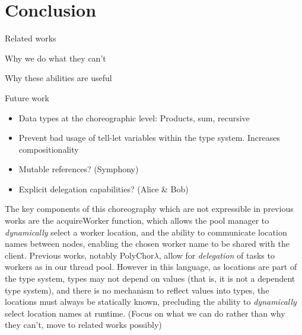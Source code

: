 \section{Conclusion}
\label{sec:conclusion}


\todo Related works

\todo Why we do what they can't

\todo Why these abilities are useful

\todo Future work
\begin{itemize}
	\item Data types at the choreographic level: Products, sum, recursive
	\item Prevent bad usage of tell-let variables within the type system. Increases compositionality
	\item Mutable references? (Symphony)
	\item Explicit delegation capabilities? (Alice \& Bob)
\end{itemize}

The key components of this choreography which are not expressible in previous works are the \textsf{acquireWorker} function, which allows the pool manager to \emph{dynamically} select a worker location, and the ability to communicate location names between nodes, enabling the chosen worker name to be shared with the client.
Previous works, notably PolyChor$\lambda$, allow for \emph{delegation} of tasks to workers as in our thread pool.
However in this language, as locations are part of the type system, types may not depend on values (that is, it is not a dependent type system), and there is no mechanism to reflect values into types, the locations must always be statically known, precluding the ability to \emph{dynamically} select location names at runtime.
(Focus on what we can do rather than why they can't, move to related works possibly)

